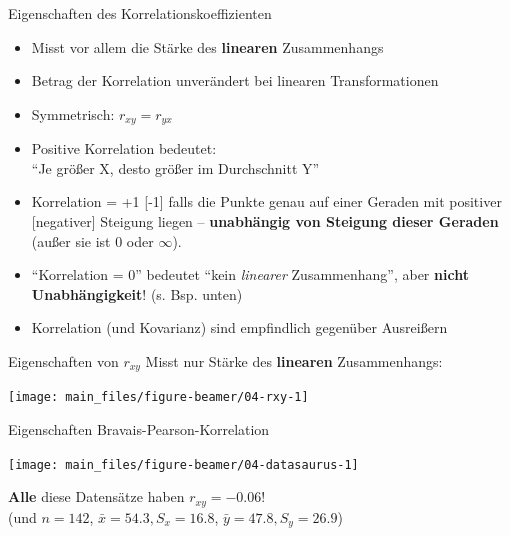 \documentclass[
  10pt,
  ignorenonframetext,
]{beamer}
\providecommand{\tightlist}{%
  \setlength{\itemsep}{0pt}\setlength{\parskip}{0pt}}
\begin{document}
\begin{frame}{Eigenschaften des Korrelationskoeffizienten}
\label{eigenschaften-des-korrelationskoeffizienten}
\begin{itemize}
\tightlist
\item
  Misst vor allem die Stärke des \textbf{linearen} Zusammenhangs
\item
  Betrag der Korrelation unverändert bei linearen Transformationen
\item
  Symmetrisch: \(r_{xy} = r_{yx}\)
\item
  Positive Korrelation bedeutet:\\
  ``Je größer X, desto größer im Durchschnitt Y''
\item
  Korrelation = +1 {[}-1{]} falls die Punkte genau auf einer Geraden mit
  positiver {[}negativer{]} Steigung liegen -- \textbf{unabhängig von
  Steigung dieser Geraden} (außer sie ist 0 oder \(\infty\)).
\item
  ``Korrelation = 0'' bedeutet ``kein \emph{linearer} Zusammenhang'',
  aber \textbf{nicht Unabhängigkeit}! (s. Bsp. unten)
\item
  Korrelation (und Kovarianz) sind empfindlich gegenüber Ausreißern
\end{itemize}
\end{frame}

\begin{frame}{Eigenschaften von \(r_{xy}\)}
\label{eigenschaften-von-r_xy}
Misst nur Stärke des \textbf{linearen} Zusammenhangs:

\scriptsize

\begin{center}\texttt{[image: main\_files/figure-beamer/04-rxy-1]} \end{center}

\normalsize
\end{frame}

\begin{frame}{Eigenschaften Bravais-Pearson-Korrelation}
\label{eigenschaften-bravais-pearson-korrelation}
\scriptsize

\begin{center}\texttt{[image: main\_files/figure-beamer/04-datasaurus-1]} \end{center}

\normalsize

\textbf{Alle} diese Datensätze haben \textbf{\(r_{xy} = -0.06\)}!\\
(und \(n = 142\), \(\bar x = 54.3, S_x = 16.8\),
\(\bar y = 47.8, S_y = 26.9\))
\end{frame}
\end{document}
